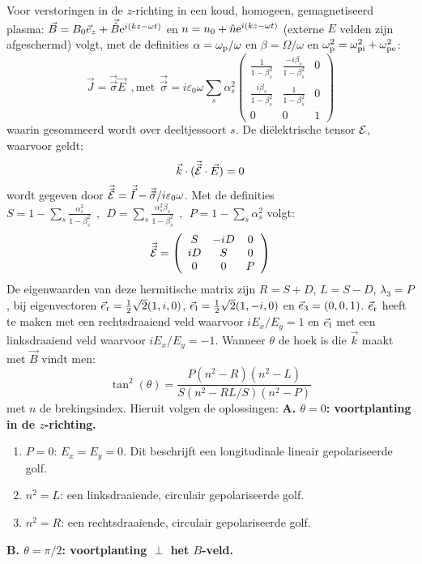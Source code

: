 \documentclass[twoside]{report}
\begin{document}
Voor verstoringen in de $z$-richting in een koud, homogeen, gemagnetiseerd
plasma: $\vec{B}=B_0\vec{e}_z+\vec{\hat{B}}{\rm e}^{i(kz-\omega t)}$ en
$n=n_0+\hat{n}{\rm e}^{i(kz-\omega t)}$ (externe $E$ velden zijn afgeschermd)
volgt, met de definities $\alpha=\omega_{\rm p}/\omega$ en $\beta=\Omega/\omega$
en $\omega_{\rm p}^2=\omega_{\rm pi}^2+\omega_{\rm pe}^2$:
\[
\vec{J}=\vec{\vec{\sigma}}\vec{E}~~,\mbox{met}~~
\vec{\vec{\sigma}}=i\varepsilon_0\omega\sum_s\alpha_s^2
\left(\begin{array}{ccc}
\displaystyle\frac{1}{1-\beta_s^2}&\displaystyle\frac{-i\beta_s}{1-\beta_s^2}&0\\
\displaystyle\frac{i\beta_s}{1-\beta_s^2}&\displaystyle\frac{1}{1-\beta_s^2}&0\\
0&0&1
\end{array}\right)
\]
waarin gesommeerd wordt over deeltjessoort $s$. De di\"elektrische tensor
$\cal E$, waarvoor geldt:
\[
\vec{k}\cdot(\vec{\vec{{\cal E}}}\cdot\vec{E})=0
\]
wordt gegeven door
$\vec{\vec{{\cal E}}}=\vec{\vec{I}}-\vec{\vec{\sigma}}/i\varepsilon_0\omega$.
\npar
Met de definities
$\displaystyle S=1-\sum_s\frac{\alpha_s^2}{1-\beta_s^2}~~,~~
D=\sum_s\frac{\alpha_s^2\beta_s}{1-\beta_s^2}~~,~~
P=1-\sum_s\alpha_s^2$
\npar
volgt:
\[
\vec{\vec{{\cal E}}}=\left(\begin{array}{ccc}S&-iD&0\\iD&S&0\\0&0&P\end{array}\right)
\]
De eigenwaarden van deze hermitische matrix zijn $R=S+D$, $L=S-D$,
$\lambda_3=P$, bij eigenvectoren $\vec{e}_{\rm r}=\mbox{$\frac{1}{2}$}\sqrt{2}(1,i,0)$,
$\vec{e}_{\rm l}=\mbox{$\frac{1}{2}$}\sqrt{2}(1,-i,0)$ en $\vec{e}_{\rm 3}=(0,0,1)$. $\vec{e}_{\rm r}$ heeft te maken met
een rechtsdraaiend veld waarvoor $iE_x/E_y=1$ en $\vec{e}_{\rm l}$ met een
linksdraaiend veld waarvoor $iE_x/E_y=-1$. Wanneer $\theta$ de hoek is die
$\vec{k}$ maakt met $\vec{B}$ vindt men:
\[
\tan^2(\theta)=\frac{P(n^2-R)(n^2-L)}{S(n^2-RL/S)(n^2-P)}
\]
met $n$ de brekingsindex. Hieruit volgen de oplossingen:
\npar
{\bf A. \boldmath$\theta=0$: voortplanting in de $z$-richting.}
\begin{enumerate}
\item $P=0$: $E_x=E_y=0$. Dit beschrijft een longitudinale lineair
      gepolariseerde golf.
\item $n^2=L$: een linksdraaiende, circulair gepolariseerde golf.
\item $n^2=R$: een rechtsdraaiende, circulair gepolariseerde golf.
\end{enumerate}
{\bf B. \boldmath$\theta=\pi/2$: voortplanting $\perp$ het $B$-veld.}
\end{document}
